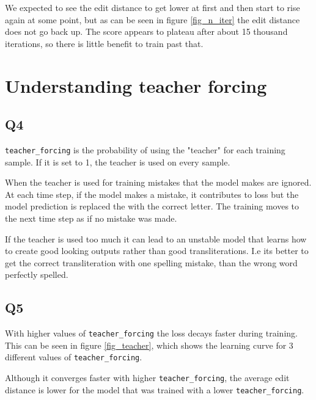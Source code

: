 \documentclass[12pt]{article}
\begin{document}
We expected to see the edit distance to get lower at first and then start to rise again at some point, but as can be seen in figure \ref{fig_n_iter} the edit distance does not go back up. The score appears to plateau after about 15 thousand iterations, so there is little benefit to train past that.

\section{Understanding teacher forcing}

\subsection{Q4}

\texttt{teacher\_forcing} is the probability of using the "teacher" for each training sample. If it is set to 1, the teacher is used on every sample.

When the teacher is used for training mistakes that the model makes are ignored. At each time step, if the model makes a mistake, it contributes to loss but the model prediction is replaced the with the correct letter. The training moves to the next time step as if no mistake was made.

If the teacher is used too much it can lead to an unstable model that learns how to create good looking outputs rather than good transliterations. I.e its better to get the correct transliteration with one spelling mistake, than the wrong word perfectly spelled.

\subsection{Q5}
 
With higher values of \texttt{teacher\_forcing} the loss decays faster during training. This can be seen in figure \ref{fig_teacher}, which shows the learning curve for 3 different values of \texttt{teacher\_forcing}.

Although it converges faster with higher \texttt{teacher\_forcing}, the average edit distance is lower for the model that was trained with a lower \texttt{teacher\_forcing}. 
\end{document}
